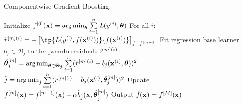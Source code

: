 
\begin{algorithm}[H]
  \begin{footnotesize}
  \begin{center}
  \caption{Componentwise Gradient Boosting.}
    \begin{algorithmic}[1]
      \State Initialize $f^{[0]}(\mathbf{x}) = \operatorname{arg\,min}_{\bm{\theta}} \sum  \limits_{i=1}^n L(y^{(i)}, \bm{\theta})$
        \State For all $i$: $\rmi = -\left[\fp{L(\yi, f(\xi))}{f(\xi)}\right]_{f=\fmd}$
          \State Fit regression base learner $b_j \in \mathcal{B}_j$ to the pseudo-residuals $\tilde{r}^{[m](i)}$:
          \State $\hat{\bm{\theta}}^{[m]}_j = \operatorname{arg\,min}_{\bm{\theta} \in \bm{\Theta_j}} \sum  \limits_{i=1}^n 
          (\tilde{r}^{[m](i)} - b_j(\mathbf{x}^{(i)}, \bm{\theta}))^2$
        \EndFor
        \State $\hat{j} = \operatorname{arg\,min}_{j} \sum  \limits_{i=1}^n (\tilde{r}^{[m](i)} - \hat{b}_j(\mathbf{x}^{(i)}, \hat{\bm{\theta}}^{[m]}_j))^2$
        \State Update $f^{[m]}(\mathbf{x}) = f^{[m-1]}(\mathbf{x}) + \alpha \hat{b}_{\hat{j}}(\mathbf{x}, \hat{\bm{\theta}}^{[m]}_{\hat{j}})$
      \EndFor
      \State Output $\hat{f}(\mathbf{x}) = f^{[M]}(\mathbf{x})$
    \end{algorithmic}
    \end{center}
    \end{footnotesize}
\end{algorithm}
